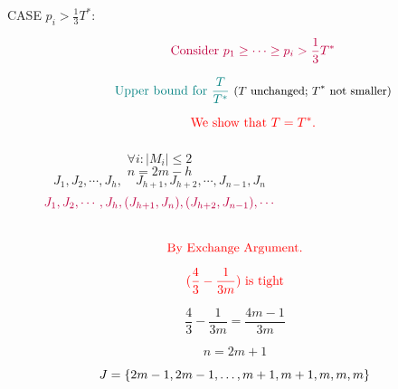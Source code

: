 \begin{frame}{}
  \begin{description}
	\item[CASE $p_i > \frac{1}{3} T^{\ast}$:]
	  \[
		\textcolor{purple}{\text{Consider } p_1 \ge \cdots \ge p_i > \frac{1}{3} T^{\ast}}
	  \]

	  \pause
	  \[
		\text{\textcolor{teal}{Upper bound for $\frac{T}{T^{\ast}}$} \small ($T$ unchanged; $T^{\ast}$ not smaller)}
	  \]

	  \pause
	  \[
		\textcolor{red}{\text{We show that } T = T^{\ast}.}
	  \]

	  \begin{columns}
		  \pause
		  \[
			\forall i: \Big|M_i\Big| \le 2
		  \]
		  \[
			n = 2m - h 
		  \]
		  \pause
		  \vspace{0.50cm}
		  \[
			J_1, J_2, \cdots, J_h, \quad  J_{h+1}, J_{h+2}, \cdots, J_{n-1}, J_{n}
		  \]
		  \pause
		  \[
			\textcolor{purple}{J_1, J_2, \cdots, J_h, (J_{h+1}, J_{n}), (J_{h+2}, J_{n-1}), \cdots}
		  \]
	  \end{columns}
  \end{description}

  \pause
  \vspace{0.50cm}
  \[
	\textcolor{red}{\text{By Exchange Argument.}}
  \]
\end{frame}

\begin{frame}{}
  \[
	\textcolor{red}{(\frac{4}{3} - \frac{1}{3m}) \text{ is tight}}
  \]

  \pause
  \[
	\frac{4}{3} - \frac{1}{3m} = \frac{4m-1}{3m}
  \]

  \pause
  \[
	n = 2m + 1
  \]

  \[
	J = \left\{ 2m-1, 2m-1,\dots, m+1, m+1, m,m,m \right\}
  \]
\end{frame}

